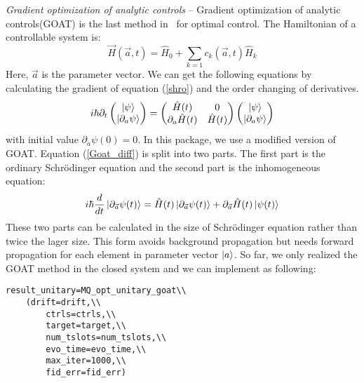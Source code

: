 \textit{Gradient optimization of analytic controls} -- Gradient optimization of analytic controls(GOAT) is the last method in \MindQuantum\ for optimal control. The Hamiltonian of a controllable system is:
\begin{equation}
    \vec{H}(\vec{a},t)=\hat{H}_{0}+\sum_{k=1}c_{k}(\vec{a},t)\hat{H}_{k}
\end{equation}
Here, $\vec{a}$ is the parameter vector. We can get the following equations by calculating the gradient of equation (\ref{shro}) and the order changing of derivatives.
\begin{equation}
    i\hbar\partial_{t}
    \begin{pmatrix}
        \ket{\psi} \\
        \ket{\partial_{a}\psi}
    \end{pmatrix}
    =
    \begin{pmatrix}
        \hat{H}(t) & 0 \\
        \partial_{a}\hat{H}(t) & \hat{H}(t)
    \end{pmatrix}
    \begin{pmatrix}
        \ket{\psi} \\
        \ket{\partial_{a}\psi}
    \end{pmatrix}
    \label{Goat_diff}
\end{equation}
with initial value $\partial_{a}\psi(0)=0$. In this package, we use a modified version of GOAT. Equation (\ref{Goat_diff}) is split into two parts. The first part is the ordinary Schrödinger equation and the second part is the inhomogeneous equation:
\begin{equation}
    i\hbar\frac{d}{dt}\ket{\partial_{\vec{a}}\psi(t)}=\hat{H}(t)\ket{\partial_{\vec{a}}\psi(t)}+\partial_{\vec{a}}\hat{H}(t)\ket{\psi(t)}
\end{equation}
These two parts can be calculated in the size of Schrödinger equation rather than twice the lager size. This form avoids background propagation but needs forward propagation for each element in parameter vector $\ket{a}$. So far, we only realized the GOAT method in the closed system and we can implement as following:
\begin{lstlisting}
result_unitary=MQ_opt_unitary_goat\\
    (drift=drift,\\
        ctrls=ctrls,\\
        target=target,\\
        num_tslots=num_tslots,\\
        evo_time=evo_time,\\
        max_iter=1000,\\
        fid_err=fid_err)
\end{lstlisting}
